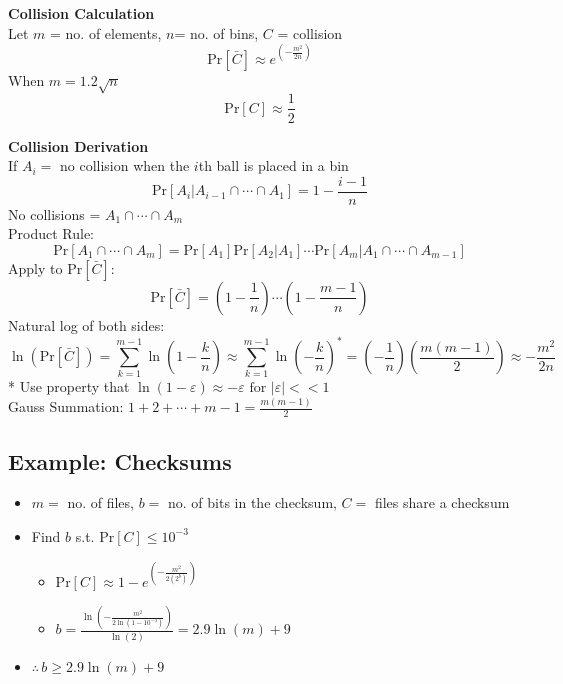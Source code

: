 \documentclass{article}\usepackage{amsmath,amssymb,amsthm,tikz,tkz-graph,color,chngpage,soul,hyperref,csquotes,graphicx,floatrow, listings}\newcommand*{\QEDB}{\hfill\ensuremath{\square}}\newtheorem*{prop}{Proposition}\renewcommand{\theenumi}{\alph{enumi}}\usepackage[shortlabels]{enumitem}\usepackage[nobreak=true]{mdframed}\usetikzlibrary{matrix,calc}\MakeOuterQuote{"}\usepackage[margin=0.75in]{geometry} \newtheorem{theorem}{Theorem}\newcommand{\Z}{\mathbb Z}\newcommand{\R}{\mathbb R}\newcommand{\Q}{\mathbb Q}\newcommand{\N}{\mathbb N}\newcommand{\x}[1]{\textrm{ #1 }}\newcommand{\pr}{\textrm{Pr}}
\begin{document}
\begin{mdframed}
\textbf{Collision Calculation}\\
Let $m$ = no. of elements, $n$= no. of bins, $C$ = collision
\begin{equation}\pr[\bar{C}]\approx e^{(-\frac{m^2}{2n})}\end{equation}
When $m=1.2\sqrt{n}$
\begin{equation}\pr[C]\approx \frac{1}{2}\end{equation}
\end{mdframed}
\begin{mdframed}
\textbf{Collision Derivation}\\
If $A_i=$ no collision when the $i$th ball is placed in a bin
\begin{equation}\pr[A_i|A_{i-1}\cap\cdots\cap A_1]=1-\frac{i-1}{n}\end{equation}
No collisions = $A_1\cap\cdots\cap A_m$\\
Product Rule:
\begin{equation}\pr[A_1\cap\cdots\cap A_m]=\pr[A_1]\pr[A_2|A_1]\cdots\pr[A_m|A_1\cap\cdots\cap A_{m-1}]\end{equation}
Apply to $\pr[\bar{C}]$:
\begin{equation}\pr[\bar{C}]=(1-\frac{1}{n})\cdots(1-\frac{m-1}{n})\end{equation}
Natural log of both sides:
\begin{equation}\ln{(\pr[\bar{C}])}=\sum\limits_{k=1}^{m-1}\ln{(1-\frac{k}{n})}\approx \sum\limits_{k=1}^{m-1}\ln{(-\frac{k}{n})}^*=(-\frac{1}{n})(\frac{m(m-1)}{2})\approx -\frac{m^2}{2n}\end{equation}
* Use property that $\ln(1-\varepsilon)\approx-\varepsilon \x{for} |\varepsilon| <<1$\\
Gauss Summation: $1+2+\cdots+m-1=\frac{m(m-1)}{2}$
\end{mdframed}
\subsection*{Example: Checksums}
\begin{itemize}
    \item $m=$ no. of files,  $b=$ no. of bits in the checksum,  $C=$ files share a checksum
    \item Find $b$ s.t. $\pr[C] \le 10^{-3}$
    \begin{itemize}[*]
        \item $\pr[C]\approx 1-e^{(-\frac{m^2}{2(2^b)})}$
        \item $b=\frac{\ln(-\frac{m^2}{2\ln(1-10^{-3})})}{\ln(2)}=2.9\ln(m)+9$
    \end{itemize}
    \item $\therefore\, b \ge 2.9\ln(m)+9$
\end{itemize}
\end{document}
